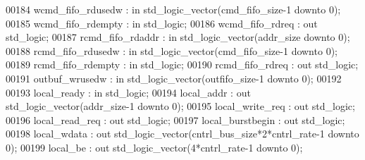 \begin{DoxyCode}
00184         wcmd_fifo_rdusedw   : \textcolor{keywordflow}{in} \textcolor{comment}{std\_logic\_vector}(cmd_fifo_size\textcolor{vhdlchar}{-}\textcolor{vhdllogic}{}\textcolor{vhdllogic}{1} \textcolor{keywordflow}{downto} \textcolor{vhdllogic}{}\textcolor{vhdllogic}{0});
00185         wcmd_fifo_rdempty   : \textcolor{keywordflow}{in} \textcolor{comment}{std\_logic};
00186         wcmd_fifo_rdreq : \textcolor{keywordflow}{out} \textcolor{comment}{std\_logic};
00187         rcmd_fifo_rdaddr    : \textcolor{keywordflow}{in} \textcolor{comment}{std\_logic\_vector}(addr_size \textcolor{keywordflow}{downto} \textcolor{vhdllogic}{}\textcolor{vhdllogic}{0});
00188         rcmd_fifo_rdusedw   : \textcolor{keywordflow}{in} \textcolor{comment}{std\_logic\_vector}(cmd_fifo_size\textcolor{vhdlchar}{-}\textcolor{vhdllogic}{}\textcolor{vhdllogic}{1} \textcolor{keywordflow}{downto} \textcolor{vhdllogic}{}\textcolor{vhdllogic}{0});
00189         rcmd_fifo_rdempty   : \textcolor{keywordflow}{in} \textcolor{comment}{std\_logic};
00190         rcmd_fifo_rdreq : \textcolor{keywordflow}{out} \textcolor{comment}{std\_logic};
00191         outbuf_wrusedw      : \textcolor{keywordflow}{in} \textcolor{comment}{std\_logic\_vector}(outfifo_size\textcolor{vhdlchar}{-}\textcolor{vhdllogic}{}\textcolor{vhdllogic}{1} \textcolor{keywordflow}{downto} \textcolor{vhdllogic}{}\textcolor{vhdllogic}{0});
00192         
00193         local_ready         : \textcolor{keywordflow}{in} \textcolor{comment}{std\_logic};
00194         local_addr          : \textcolor{keywordflow}{out} \textcolor{comment}{std\_logic\_vector}(addr_size\textcolor{vhdlchar}{-}\textcolor{vhdllogic}{}\textcolor{vhdllogic}{1} \textcolor{keywordflow}{downto} \textcolor{vhdllogic}{}\textcolor{vhdllogic}{0});
00195         local_write_req : \textcolor{keywordflow}{out} \textcolor{comment}{std\_logic};
00196         local_read_req      : \textcolor{keywordflow}{out} \textcolor{comment}{std\_logic};
00197         local_burstbegin    : \textcolor{keywordflow}{out} \textcolor{comment}{std\_logic};
00198         local_wdata         : \textcolor{keywordflow}{out} \textcolor{comment}{std\_logic\_vector}(cntrl_bus_size*\textcolor{vhdllogic}{}\textcolor{vhdllogic}{2}*cntrl_rate\textcolor{vhdlchar}{-}\textcolor{vhdllogic}{}\textcolor{vhdllogic}{1} \textcolor{keywordflow}{downto} \textcolor{vhdllogic}{}\textcolor{vhdllogic}{0});
00199         local_be                : \textcolor{keywordflow}{out} \textcolor{comment}{std\_logic\_vector}(\textcolor{vhdllogic}{}\textcolor{vhdllogic}{4}*cntrl_rate\textcolor{vhdlchar}{-}\textcolor{vhdllogic}{}\textcolor{vhdllogic}{1} \textcolor{keywordflow}{downto} \textcolor{vhdllogic}{}\textcolor{vhdllogic}{0});

\end{DoxyCode}
